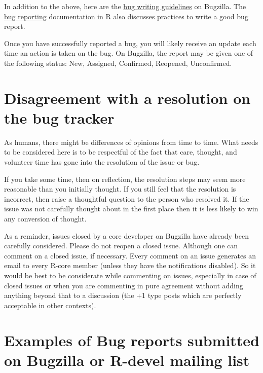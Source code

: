 \documentclass[
]{book}
\begin{document}
In addition to the above, here are the \href{https://bugs.r-project.org/bugzilla/page.cgi?id=bug-writing.html}{bug writing guidelines} on Bugzilla. The \href{https://www.r-project.org/bugs.html\#writing-a-good-bug-report}{bug reporting} documentation in R also discusses practices to write a good bug report.

Once you have successfully reported a bug, you will likely receive an update each time an action is taken on the bug. On Bugzilla, the report may be given one of the following status: New, Assigned, Confirmed, Reopened, Unconfirmed.

\hypertarget{disagreement-with-a-resolution-on-the-bug-tracker}{%
\section{Disagreement with a resolution on the bug tracker}\label{disagreement-with-a-resolution-on-the-bug-tracker}}

As humans, there might be differences of opinions from time to time. What needs to be considered here is to be respectful of the fact that care, thought, and volunteer time has gone into the resolution of the issue or bug.

If you take some time, then on reflection, the resolution steps may seem more reasonable than you initially thought. If you still feel that the resolution is incorrect, then raise a thoughtful question to the person who resolved it. If the issue was not carefully thought about in the first place then it is less likely to win any conversion of thought.

As a reminder, issues closed by a core developer on Bugzilla have already been carefully considered. Please do not reopen a closed issue. Although one can comment on a closed issue, if necessary. Every comment on an issue generates an email to every R-core member (unless they have the notifications disabled). So it would be best to be considerate while commenting on issues, especially in case of closed issues or when you are commenting in pure agreement without adding anything beyond that to a discussion (the +1 type posts which are perfectly acceptable in other contexts).

\hypertarget{examples-of-bug-reports-submitted-on-bugzilla-or-r-devel-mailing-list}{%
\section{Examples of Bug reports submitted on Bugzilla or R-devel mailing list}\label{examples-of-bug-reports-submitted-on-bugzilla-or-r-devel-mailing-list}}
\end{document}
